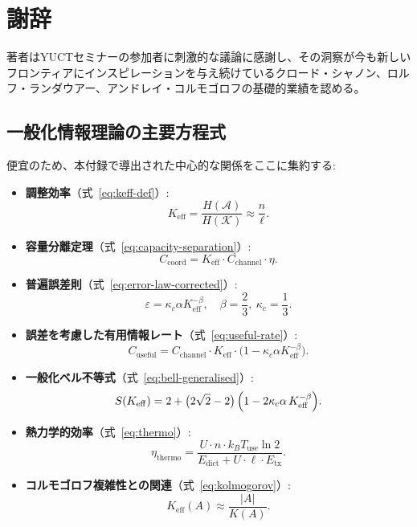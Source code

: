 \documentclass[12pt,a4paper]{article}
\theoremstyle{definition}
\theoremstyle{remark}
\newcommand{\Keff}{K_{\mathrm{eff}}}
\begin{document}
	\section*{謝辞}
	
	著者はYUCTセミナーの参加者に刺激的な議論に感謝し、その洞察が今も新しいフロンティアにインスピレーションを与え続けているクロード・シャノン、ロルフ・ランダウアー、アンドレイ・コルモゴロフの基礎的業績を認める。
	
	\subsection*{一般化情報理論の主要方程式}
	便宜のため、本付録で導出された中心的な関係をここに集約する:
	
	\begin{itemize}
		\item \textbf{調整効率}（式~\eqref{eq:keff-def}）:
		\[
		\Keff = \frac{H(\mathcal{A})}{H(\mathcal{K})} \approx \frac{n}{\ell}.
		\]
		
		\item \textbf{容量分離定理}（式~\eqref{eq:capacity-separation}）:
		\[
		C_{\text{coord}} = \Keff \cdot C_{\text{channel}} \cdot \eta.
		\]
		
		\item \textbf{普遍誤差則}（式~\eqref{eq:error-law-corrected}）:
		\[
		\varepsilon = \kappa_c \alpha K_{\mathrm{eff}}^{-\beta}, \quad \beta = \frac{2}{3},\ \kappa_c = \frac{1}{3}.
		\]
		
		\item \textbf{誤差を考慮した有用情報レート}（式~\eqref{eq:useful-rate}）:
		\[
		C_{\text{useful}} = C_{\text{channel}} \cdot \Keff \cdot \bigl(1 - \kappa_c \alpha K_{\mathrm{eff}}^{-\beta}\bigr).
		\]
		
		\item \textbf{一般化ベル不等式}（式~\eqref{eq:bell-generalised}）:
		\[
		S(K_{\mathrm{eff}}) = 2 + \bigl(2\sqrt{2}-2\bigr)\,\Bigl(1 - 2\kappa_c\alpha\,K_{\mathrm{eff}}^{-\beta}\Bigr).
		\]
		
		\item \textbf{熱力学的効率}（式~\eqref{eq:thermo}）:
		\[
		\eta_{\text{thermo}} = \frac{U \cdot n \cdot k_B T_{\text{use}} \ln 2}{E_{\text{dict}} + U \cdot \ell \cdot E_{\text{tx}}}.
		\]
		
		\item \textbf{コルモゴロフ複雑性との関連}（式~\eqref{eq:kolmogorov}）:
		\[
		\Keff(A) \approx \frac{|A|}{K(A)}.
		\]
	\end{itemize}
	
\end{document}

